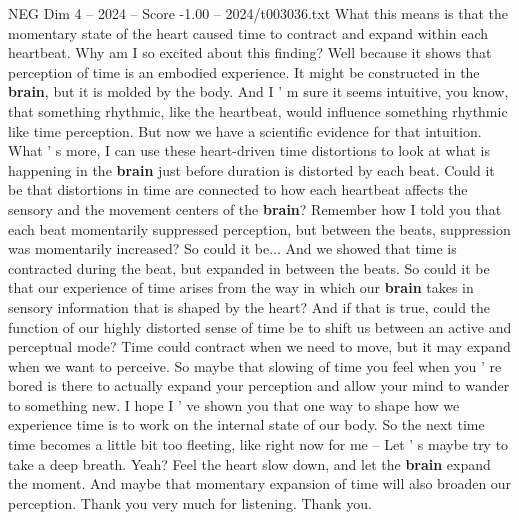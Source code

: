 \begin{textsample}{NEG Dim 4 – 2024 – Score -1.00 – 2024/t003036.txt}
What this means is that the momentary state of the heart caused time to contract and expand within each heartbeat.
Why am I so excited about this finding?
Well because it shows that perception of time is an embodied experience.
It might be constructed in the \textbf{brain}, but it is molded by the body.
And I ' m sure it seems intuitive, you know, that something rhythmic, like the heartbeat, would influence something rhythmic like time perception.
But now we have a scientific evidence for that intuition.
What ' s more, I can use these heart-driven time distortions to look at what is happening in the \textbf{brain} just before duration is distorted by each beat.
Could it be that distortions in time are connected to how each heartbeat affects the sensory and the movement centers of the \textbf{brain}?
Remember how I told you that each beat momentarily suppressed perception, but between the beats, suppression was momentarily increased?
So could it be...
And we showed that time is contracted during the beat, but expanded in between the beats.
So could it be that our experience of time arises from the way in which our \textbf{brain} takes in sensory information that is shaped by the heart?
And if that is true, could the function of our highly distorted sense of time be to shift us between an active and perceptual mode?
Time could contract when we need to move, but it may expand when we want to perceive.
So maybe that slowing of time you feel when you ' re bored is there to actually expand your perception and allow your mind to wander to something new.
I hope I ' ve shown you that one way to shape how we experience time is to work on the internal state of our body.
So the next time time becomes a little bit too fleeting, like right now for me -- Let ' s maybe try to take a deep breath.
Yeah?
Feel the heart slow down, and let the \textbf{brain} expand the moment.
And maybe that momentary expansion of time will also broaden our perception.
Thank you very much for listening.
Thank you.

\end{textsample}
